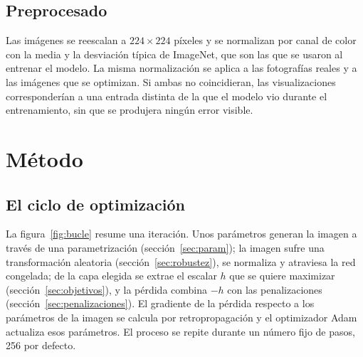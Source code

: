 \documentclass[11pt,a4paper]{article}
\begin{document}
\subsection{Preprocesado}

Las imágenes se reescalan a $224 \times 224$ píxeles y se normalizan por
canal de color con la media y la desviación típica de ImageNet, que son las
que se usaron al entrenar el modelo. La misma normalización se aplica a las
fotografías reales y a las imágenes que se optimizan. Si ambas no
coincidieran, las visualizaciones corresponderían a una entrada distinta de
la que el modelo vio durante el entrenamiento, sin que se produjera ningún
error visible.

\section{Método}
\label{sec:metodo}

\subsection{El ciclo de optimización}

La figura~\ref{fig:bucle} resume una iteración. Unos parámetros generan la
imagen a través de una parametrización (sección~\ref{sec:param}); la imagen
sufre una transformación aleatoria (sección~\ref{sec:robustez}), se
normaliza y atraviesa la red congelada; de la capa elegida se extrae el
escalar $h$ que se quiere maximizar (sección~\ref{sec:objetivos}), y la
pérdida combina $-h$ con las penalizaciones
(sección~\ref{sec:penalizaciones}). El gradiente de la pérdida respecto a
los parámetros de la imagen se calcula por retropropagación y el
optimizador Adam~\cite{adam} actualiza esos parámetros. El proceso se
repite durante un número fijo de pasos, 256 por defecto.
\end{document}

